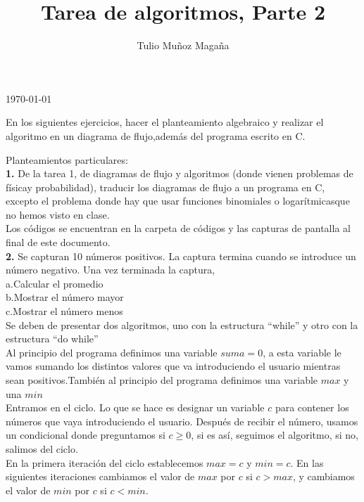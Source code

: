 \documentclass{article}
\begin{document}
\author{Tulio Muñoz Magaña}
\title{Tarea de algoritmos, Parte 2}
\today
\maketitle

En los siguientes ejercicios, hacer el planteamiento algebraico y realizar el algoritmo en un diagrama de flujo,además del programa escrito en C.

Planteamientos particulares:\\

\textbf{1.} De la tarea 1, de diagramas de flujo y algoritmos (donde vienen problemas de físicay probabilidad), traducir los diagramas de flujo a un programa en C, excepto el problema donde hay que usar funciones binomiales o logarítmicasque no hemos visto en clase.\\

Los códigos se encuentran en la carpeta de códigos y las capturas de pantalla al final de este documento.\\

\textbf{2.} Se capturan 10 números positivos. La captura termina cuando se introduce un número negativo. Una vez terminada la captura,\\
a.Calcular el promedio\\
b.Mostrar el número mayor\\
c.Mostrar el número menos\\
Se deben de presentar dos algoritmos, uno con la estructura “while” y otro con la estructura “do while”\\

Al principio del programa definimos una variable $suma = 0$, a esta variable le vamos sumando los distintos valores que va introduciendo el usuario mientras sean positivos.También al principio del programa definimos una variable $max$ y una $min$\\

Entramos en el ciclo. Lo que se hace es designar un variable $c$ para contener los números que vaya introduciendo el usuario. Después de recibir el número, usamos un condicional donde preguntamos si $c \geq 0$, si es así, seguimos el algoritmo, si no, salimos del ciclo.\\

En la primera iteración del ciclo establecemos $max = c$ y $min = c$. En las siguientes iteraciones cambiamos el valor de $max$ por $c$ si $c > max$, y cambiamos el valor de $min$ por $c$ si $c < min$.\\
\end{document}
